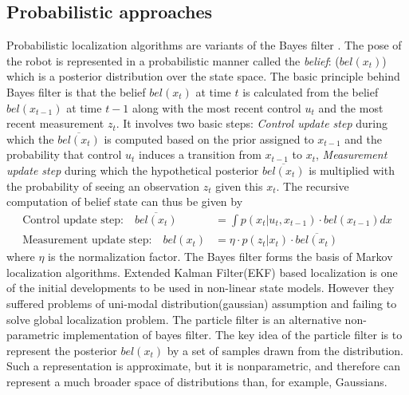 \subsection{Probabilistic approaches}
\label{ssec:prob_approaches}
Probabilistic localization algorithms are variants of the Bayes filter \cite{thrun2005probabilistic}. The pose of the robot is represented in a probabilistic manner called the \emph{belief}: ($bel(x_t)$) which is a posterior distribution over the state space. The basic principle behind Bayes filter is that the belief $bel(x_t)$ at time $t$ is calculated from the belief $bel(x_{t-1})$ at time $t-1$ along with the most recent control $u_t$ and the most recent measurement $z_t$. It involves two basic steps: \emph{Control update step} during which the $\overline{bel(x_t)}$ is computed based on the prior assigned to $x_{t-1}$ and the probability that control $u_t$ induces a transition from $x_{t-1}$ to $x_t$, \emph{Measurement update step} during which the hypothetical posterior $\overline{bel(x_t)}$ is multiplied with the probability of seeing an observation $z_t$ given this $x_t$. The recursive computation of belief state can thus be given by
\begin{align*}
\text{Control update step:}\quad \overline{bel(x_t)} &= \int p(x_t\vert u_t,x_{t-1})\cdot bel(x_{t-1}) dx \\
\text{Measurement update step:}\quad {bel(x_t)} &= \eta\cdot p(z_t\vert x_{t})\cdot \overline{bel(x_t)}
\end{align*}
where $\eta$ is the normalization factor. The Bayes filter forms the basis of Markov localization algorithms. Extended Kalman Filter(EKF) based localization is one of the initial developments to be used in non-linear state models. However they suffered problems of uni-modal distribution(gaussian) assumption and failing to solve global localization problem. The particle filter \cite{thrun2005probabilistic} is an alternative non-parametric implementation of bayes filter. The key idea of the particle filter is to represent the posterior $bel(x_t)$ by a set of samples drawn from the distribution. Such a representation is approximate, but it is nonparametric, and therefore can represent a much broader space of distributions than, for example, Gaussians. 
